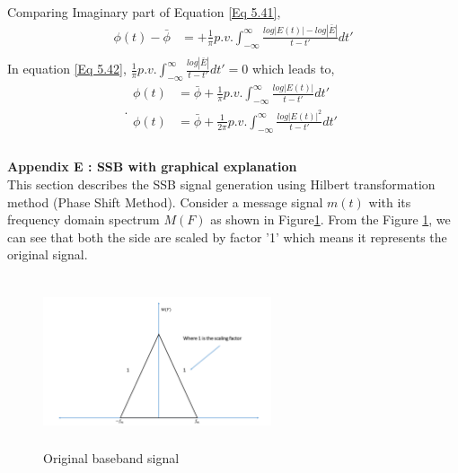Comparing Imaginary part of Equation \ref{Eq 5.41},
\begin{equation}
\begin{split}
\phi(t)-\bar{\phi} &= + \frac{1}{\pi} p.v. \int_{-\infty}^{\infty} \frac{log|E(t)|-log|\bar{E}|}{t-t'} dt'\\
\end{split}
\label{Eq 5.42}
\end{equation}
In equation \ref{Eq 5.42}, $\frac{1}{\pi} p.v. \int_{-\infty}^{\infty} \frac{log|\bar{E}|}{t-t'} dt'=0$ which leads to,
\begin{equation}.
\begin{split}
\phi(t) &= \bar{\phi} + \frac{1}{\pi} p.v. \int_{-\infty}^{\infty} \frac{log|E(t)|}{t-t'} dt'\\
\phi(t) &= \bar{\phi} + \frac{1}{2\pi} p.v. \int_{-\infty}^{\infty} \frac{log|E(t)|^2}{t-t'} dt'\\
\end{split}
\label{Eq 5.43}
\end{equation}
\\
\textbf{Appendix E : SSB with graphical explanation}\\
This section describes the SSB signal generation using Hilbert transformation method (Phase Shift Method). Consider a message signal $m(t)$ with its frequency domain spectrum $M(F)$ as shown in Figure\ref{Original_baseband_signal}. From the Figure \ref{Original_baseband_signal}, we can see that both the side are scaled by factor '1' which means it represents the original signal.
\begin{figure}[h]
	\centering
	\includegraphics[width=0.6\textwidth, height=5cm]{./sdf/simplified_coherent_receiver/figures/SSB1.pdf}
	\caption{Original baseband signal}\label{Original_baseband_signal}
\end{figure}\\ 	
